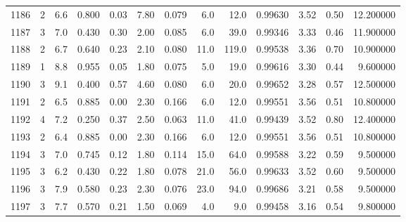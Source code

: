 \begin{tabular}{lrrrrrrrrrrrr}
1186 &        2 &            6.6 &             0.800 &         0.03 &            7.80 &      0.079 &                  6.0 &                  12.0 &  0.99630 &  3.52 &       0.50 &  12.200000 \\
1187 &        3 &            7.0 &             0.430 &         0.30 &            2.00 &      0.085 &                  6.0 &                  39.0 &  0.99346 &  3.33 &       0.46 &  11.900000 \\
1188 &        2 &            6.7 &             0.640 &         0.23 &            2.10 &      0.080 &                 11.0 &                 119.0 &  0.99538 &  3.36 &       0.70 &  10.900000 \\
1189 &        1 &            8.8 &             0.955 &         0.05 &            1.80 &      0.075 &                  5.0 &                  19.0 &  0.99616 &  3.30 &       0.44 &   9.600000 \\
1190 &        3 &            9.1 &             0.400 &         0.57 &            4.60 &      0.080 &                  6.0 &                  20.0 &  0.99652 &  3.28 &       0.57 &  12.500000 \\
1191 &        2 &            6.5 &             0.885 &         0.00 &            2.30 &      0.166 &                  6.0 &                  12.0 &  0.99551 &  3.56 &       0.51 &  10.800000 \\
1192 &        4 &            7.2 &             0.250 &         0.37 &            2.50 &      0.063 &                 11.0 &                  41.0 &  0.99439 &  3.52 &       0.80 &  12.400000 \\
1193 &        2 &            6.4 &             0.885 &         0.00 &            2.30 &      0.166 &                  6.0 &                  12.0 &  0.99551 &  3.56 &       0.51 &  10.800000 \\
1194 &        3 &            7.0 &             0.745 &         0.12 &            1.80 &      0.114 &                 15.0 &                  64.0 &  0.99588 &  3.22 &       0.59 &   9.500000 \\
1195 &        3 &            6.2 &             0.430 &         0.22 &            1.80 &      0.078 &                 21.0 &                  56.0 &  0.99633 &  3.52 &       0.60 &   9.500000 \\
1196 &        3 &            7.9 &             0.580 &         0.23 &            2.30 &      0.076 &                 23.0 &                  94.0 &  0.99686 &  3.21 &       0.58 &   9.500000 \\
1197 &        3 &            7.7 &             0.570 &         0.21 &            1.50 &      0.069 &                  4.0 &                   9.0 &  0.99458 &  3.16 &       0.54 &   9.800000 \\

\end{tabular}

